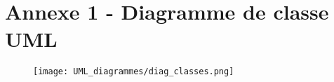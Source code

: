\documentclass[11pt]{article}
\begin{document}

\appendix  %

\section*{Annexe 1 - Diagramme de classe UML}

\begin{figure}[H]
    \label{UML_classes}
    \centering
    \texttt{[image: UML\_diagrammes/diag\_classes.png]}
\end{figure}



\restoregeometry


\restoregeometry
\end{document}
